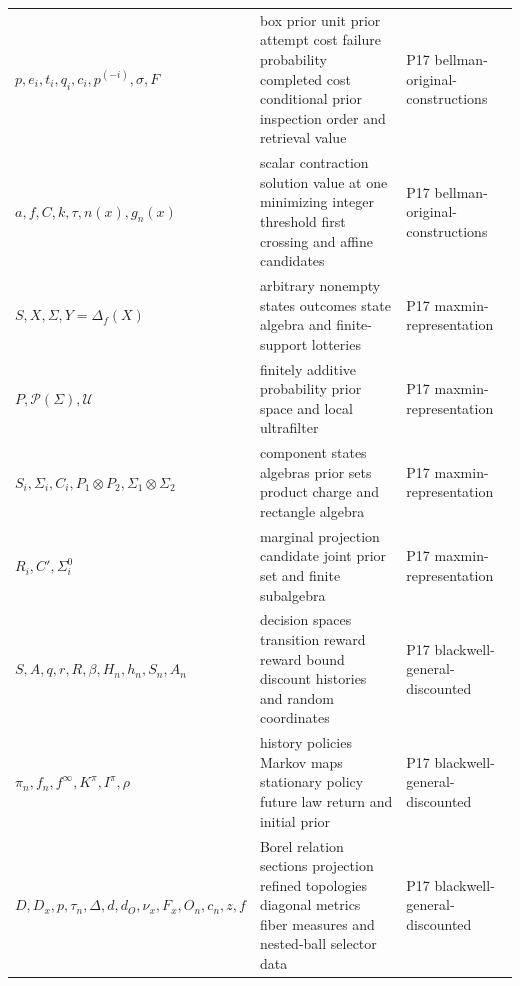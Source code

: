 \begin{longtable}{@{}p{}p{}p{}@{}}
\(p,\allowbreak e_i,\allowbreak t_i,\allowbreak q_i,\allowbreak c_i,\allowbreak p^{(-i)},\allowbreak \sigma,\allowbreak F\) & box prior unit prior attempt cost failure probability completed cost conditional prior inspection order and retrieval value & P17 bellman-\allowbreak{}original-\allowbreak{}constructions \\
\(a,\allowbreak f,\allowbreak C,\allowbreak k,\allowbreak \tau,\allowbreak n(x),\allowbreak g_n(x)\) & scalar contraction solution value at one minimizing integer threshold first crossing and affine candidates & P17 bellman-\allowbreak{}original-\allowbreak{}constructions \\
\(S,\allowbreak X,\allowbreak \Sigma,\allowbreak Y=\Delta_f(X)\) & arbitrary nonempty states outcomes state algebra and finite-support lotteries & P17 maxmin-\allowbreak{}representation \\
\(P,\allowbreak \mathcal P(\Sigma),\allowbreak \mathcal U\) & finitely additive probability prior space and local ultrafilter & P17 maxmin-\allowbreak{}representation \\
\(S_i,\allowbreak \Sigma_i,\allowbreak C_i,\allowbreak P_1\otimes P_2,\allowbreak \Sigma_1\otimes\Sigma_2\) & component states algebras prior sets product charge and rectangle algebra & P17 maxmin-\allowbreak{}representation \\
\(R_i,\allowbreak C',\allowbreak \Sigma_i^0\) & marginal projection candidate joint prior set and finite subalgebra & P17 maxmin-\allowbreak{}representation \\
\(S,\allowbreak A,\allowbreak q,\allowbreak r,\allowbreak R,\allowbreak \beta,\allowbreak H_n,\allowbreak h_n,\allowbreak S_n,\allowbreak A_n\) & decision spaces transition reward reward bound discount histories and random coordinates & P17 blackwell-\allowbreak{}general-\allowbreak{}discounted \\
\(\pi_n,\allowbreak f_n,\allowbreak f^\infty,\allowbreak K^\pi,\allowbreak I^\pi,\allowbreak \rho\) & history policies Markov maps stationary policy future law return and initial prior & P17 blackwell-\allowbreak{}general-\allowbreak{}discounted \\
\(D,\allowbreak D_x,\allowbreak p,\allowbreak \tau_n,\allowbreak \Delta,\allowbreak d,\allowbreak d_O,\allowbreak \nu_x,\allowbreak F_x,\allowbreak O_n,\allowbreak c_n,\allowbreak z,\allowbreak f\) & Borel relation sections projection refined topologies diagonal metrics fiber measures and nested-ball selector data & P17 blackwell-\allowbreak{}general-\allowbreak{}discounted \\

\end{longtable}
